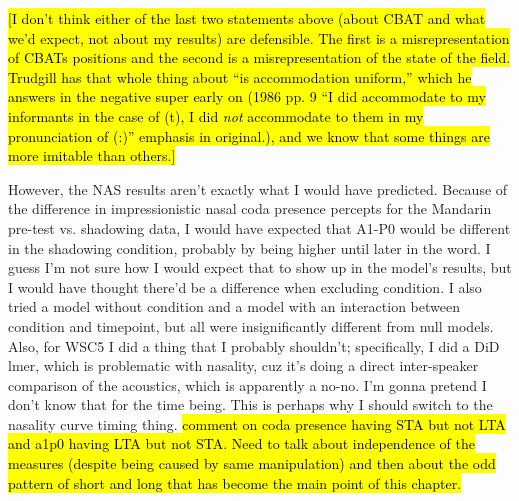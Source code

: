     \hl{[I don't think either of the last two statements  above (about CBAT and what we'd expect, not about my results) are defensible. The first is a misrepresentation of CBATs positions and the second is a misrepresentation of the state of the field. Trudgill has that whole thing about ``is accommodation uniform,'' which he answers in the negative super early on (1986 pp. 9 ``I did accommodate to my informants in the case of (t), I did \textit{not} accommodate to them in my pronunciation of (}\hl{:)'' emphasis in original.), and we know that some things are more imitable than others.]} 
    

    However, the NAS results aren't exactly what I would have predicted. Because of the difference in impressionistic nasal coda presence percepts for the Mandarin pre-test vs. shadowing data, I would have expected that A1-P0 would be different in the shadowing condition, probably by being higher until later in the word. I guess I'm not sure how I would expect that to show up in the model's results, but I would have thought there'd be a difference when excluding condition. I also tried a model without condition and a model with an interaction between condition and timepoint, but all were insignificantly different from null models. Also, for WSC5 I did a thing that I probably shouldn't; specifically, I did a DiD lmer, which is problematic with nasality, cuz it's doing a direct inter-speaker comparison of the acoustics, which is apparently a no-no. I'm gonna pretend I don't know that for the time being. This is perhaps why I should switch to the nasality curve timing thing. \hl{comment on coda presence having STA but not LTA and a1p0 having LTA but not STA. Need to talk about independence of the measures (despite being caused by same manipulation) and then about the odd pattern of short and long that has become the main point of this chapter.}

